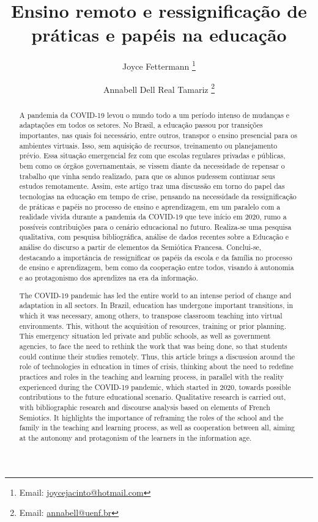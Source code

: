 \documentclass{textolivre}
\title{Ensino remoto e ressignificação de práticas e papéis na educação}
\author[1]{Joyce Fettermann \orcid{0000-0002-0479-6005} \thanks{Email: \url{joycejacinto@hotmail.com}}}
\author[1]{Annabell Dell Real Tamariz  \orcid{0000-0001-9951-0657} \thanks{Email: \url{annabell@uenf.br}}}
\affil[1]{Universidade Estadual do Norte Fluminense Darcy Ribeiro, Campos dos Goytacazes, RJ, Brasil.}
\begin{document}
\maketitle

\begin{polyabstract}
\begin{abstract}
A pandemia da COVID-19 levou o mundo todo a um período intenso de mudanças e adaptações em todos os setores. No Brasil, a educação passou por transições importantes, nas quais foi necessário, entre outros, transpor o ensino presencial para os ambientes virtuais. Isso, sem aquisição de recursos, treinamento ou planejamento prévio. Essa situação emergencial fez com que escolas regulares privadas e públicas, bem como os órgãos governamentais, se vissem diante da necessidade de repensar o trabalho que vinha sendo realizado, para que os alunos pudessem continuar seus estudos remotamente. Assim, este artigo traz uma discussão em torno do papel das tecnologias na educação em tempo de crise, pensando na necessidade da ressignificação de práticas e papéis no processo de ensino e aprendizagem, em um paralelo com a realidade vivida durante a pandemia da COVID-19 que teve início em 2020, rumo a possíveis contribuições para o cenário educacional no futuro. Realiza-se uma pesquisa qualitativa, com pesquisa bibliográfica, análise de dados recentes sobre a Educação e análise do discurso a partir de elementos da Semiótica Francesa. Conclui-se, destacando a importância de ressignificar os papéis da escola e da família no processo de ensino e aprendizagem, bem como da cooperação entre todos, visando à autonomia e ao protagonismo dos aprendizes na era da informação.

\end{abstract}

\begin{english}
\begin{abstract}
The COVID-19 pandemic has led the entire world to an intense period of change and adaptation in all sectors. In Brazil, education has undergone important transitions, in which it was necessary, among others, to transpose classroom teaching into virtual environments. This, without the acquisition of resources, training or prior planning. This emergency situation led private and public schools, as well as government agencies, to face the need to rethink the work that was being done, so that students could continue their studies remotely. Thus, this article brings a discussion around the role of technologies in education in times of crisis, thinking about the need to redefine practices and roles in the teaching and learning process, in parallel with the reality experienced during the COVID-19 pandemic, which started in 2020, towards possible contributions to the future educational scenario. Qualitative research is carried out, with bibliographic research and discourse analysis based on elements of French Semiotics. It highlights the importance of reframing the roles of the school and the family in the teaching and learning process, as well as cooperation between all, aiming at the autonomy and protagonism of the learners in the information age.


\end{abstract}
\end{english}
\end{polyabstract}
\end{document}
